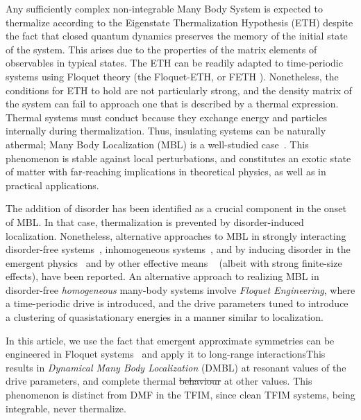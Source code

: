 \documentclass[%
reprint,
superscriptaddress,
amsmath,amssymb,
aps,
prb,
showkeys,
]{revtex4-2}
\providecommand{\DIFaddtex}[1]{{\protect\color{blue}\uwave{#1}}} %
\providecommand{\DIFdeltex}[1]{{\protect\color{red}\sout{#1}}}                      %
\providecommand{\DIFaddbegin}{} %
\providecommand{\DIFaddend}{} %
\providecommand{\DIFdelbegin}{} %
\providecommand{\DIFdelend}{} %
\providecommand{\DIFadd}[1]{\texorpdfstring{\DIFaddtex{#1}}{#1}} %
\providecommand{\DIFdel}[1]{\texorpdfstring{\DIFdeltex{#1}}{}} %
\newcommand{\DIFscaledelfig}{0.5}
\newlength{\DIFdelgraphicswidth} %
\newlength{\DIFdelgraphicsheight} %
\newcommand{\DIFaddincludegraphics}[2][]{{\color{blue}\fbox{\DIFOincludegraphics[#1]{#2}}}} %
\newcommand{\DIFdelincludegraphics}[2][]{%
\sbox{\DIFdelgraphicsbox}{\DIFOincludegraphics[#1]{#2}}%
\settoboxwidth{\DIFdelgraphicswidth}{\DIFdelgraphicsbox} %
\settoboxtotalheight{\DIFdelgraphicsheight}{\DIFdelgraphicsbox} %
\scalebox{\DIFscaledelfig}{%
\parbox[b]{\DIFdelgraphicswidth}{\usebox{\DIFdelgraphicsbox}\\[-\baselineskip] \rule{\DIFdelgraphicswidth}{0em}}\llap{\resizebox{\DIFdelgraphicswidth}{\DIFdelgraphicsheight}{%
\setlength{\unitlength}{\DIFdelgraphicswidth}%
\begin{picture}(1,1)%
\thicklines\linethickness{2pt} %
{\color[rgb]{1,0,0}\put(0,0){\framebox(1,1){}}}%
{\color[rgb]{1,0,0}\put(0,0){\line( 1,1){1}}}%
{\color[rgb]{1,0,0}\put(0,1){\line(1,-1){1}}}%
\end{picture}%
}\hspace*{3pt}}} %
} %
\DeclareRobustCommand{\DIFaddbegin}{\DIFOaddbegin \let\includegraphics\DIFaddincludegraphics} %
\DeclareRobustCommand{\DIFaddend}{\DIFOaddend \let\includegraphics\DIFOincludegraphics} %
\DeclareRobustCommand{\DIFdelbegin}{\DIFOdelbegin \let\includegraphics\DIFdelincludegraphics} %
\DeclareRobustCommand{\DIFdelend}{\DIFOaddend \let\includegraphics\DIFOincludegraphics} %
\begin{document}
Any sufficiently complex non-integrable Many Body System is expected to thermalize according to the Eigenstate Thermalization Hypothesis (ETH) despite the fact that closed quantum dynamics preserves the memory of the initial state of the system. This arises due to the properties of the matrix elements of observables 
in typical states\cite{zhang_floquet_2016}. The ETH can be readily adapted to time-periodic systems using Floquet theory (the Floquet-ETH, or FETH \DIFaddbegin \DIFadd{\mbox{%
\cite{Mori_2018, Kim_2014, Mizuta_2020, Mori_2023_1}}\hspace{0pt}%
}\DIFaddend ). Nonetheless, the conditions for ETH to hold are not particularly strong, and the density matrix of the system can fail to approach one that is described by a thermal expression.  Thermal systems must conduct because they exchange energy and particles internally during thermalization. Thus, insulating systems can be naturally athermal;  Many Body Localization (MBL) is a well-studied case~\cite{khemani_phase_2016}. This phenomenon is stable against local perturbations, and constitutes an exotic state of matter with far-reaching implications in theoretical physics, as well as in practical applications\cite{yunger_halpern_quantum_2019}.

The addition of disorder has been identified as a crucial component in the onset of MBL. In that case, thermalization is prevented by disorder-induced localization. Nonetheless, alternative approaches to MBL in strongly interacting disorder-free systems~\cite{diptiman2014, Carleo2012,aditya2023dynamical}, inhomogeneous systems~\cite{alessandro_markus, Grover2014,miles2015,Smith2017}, and by inducing disorder in the emergent physics~\cite{MBL_emergent_disorder} and by other effective means ~\cite{miles2015} (albeit with strong finite-size effects), have been reported. An alternative approach to realizing MBL in disorder-free \emph{homogeneous} many-body systems involve \textit{Floquet Engineering}, where a time-periodic drive is introduced, and the drive parameters tuned to introduce a clustering of quasistationary energies in a manner similar to localization\cite{zhang_floquet_2016}.


In this article, {we use the fact that emergent approximate symmetries can be engineered in Floquet systems~\cite{Engelhardt2013,asmi:scars} and apply it to long-range interactions\DIFaddbegin \DIFadd{. }\DIFaddend This results in \textit{Dynamical Many Body Localization} (DMBL) at resonant values of the drive parameters}, and complete thermal \DIFdelbegin \DIFdel{behaviour }\DIFdelend \DIFaddbegin \DIFadd{behavior }\DIFaddend at other values. This phenomenon is distinct from DMF in the TFIM, since clean TFIM systems, being integrable, never thermalize. \DIFdelbegin %
\end{document}
